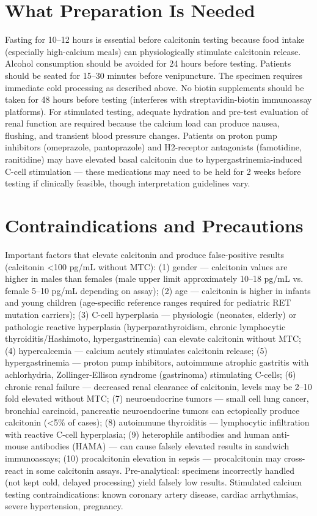 \section*{What Preparation Is Needed}
Fasting for 10--12 hours is essential before calcitonin testing because food intake (especially high-calcium meals) can physiologically stimulate calcitonin release. Alcohol consumption should be avoided for 24 hours before testing. Patients should be seated for 15--30 minutes before venipuncture. The specimen requires immediate cold processing as described above. No biotin supplements should be taken for 48 hours before testing (interferes with streptavidin-biotin immunoassay platforms). For stimulated testing, adequate hydration and pre-test evaluation of renal function are required because the calcium load can produce nausea, flushing, and transient blood pressure changes. Patients on proton pump inhibitors (omeprazole, pantoprazole) and H2-receptor antagonists (famotidine, ranitidine) may have elevated basal calcitonin due to hypergastrinemia-induced C-cell stimulation --- these medications may need to be held for 2 weeks before testing if clinically feasible, though interpretation guidelines vary.

\section*{Contraindications and Precautions}
Important factors that elevate calcitonin and produce false-positive results (calcitonin <100 pg/mL without MTC): (1) gender --- calcitonin values are higher in males than females (male upper limit approximately 10--18 pg/mL vs. female 5--10 pg/mL depending on assay); (2) age --- calcitonin is higher in infants and young children (age-specific reference ranges required for pediatric RET mutation carriers); (3) C-cell hyperplasia --- physiologic (neonates, elderly) or pathologic reactive hyperplasia (hyperparathyroidism, chronic lymphocytic thyroiditis/Hashimoto, hypergastrinemia) can elevate calcitonin without MTC; (4) hypercalcemia --- calcium acutely stimulates calcitonin release; (5) hypergastrinemia --- proton pump inhibitors, autoimmune atrophic gastritis with achlorhydria, Zollinger-Ellison syndrome (gastrinoma) stimulating C-cells; (6) chronic renal failure --- decreased renal clearance of calcitonin, levels may be 2--10 fold elevated without MTC; (7) neuroendocrine tumors --- small cell lung cancer, bronchial carcinoid, pancreatic neuroendocrine tumors can ectopically produce calcitonin (<5\% of cases); (8) autoimmune thyroiditis --- lymphocytic infiltration with reactive C-cell hyperplasia; (9) heterophile antibodies and human anti-mouse antibodies (HAMA) --- can cause falsely elevated results in sandwich immunoassays; (10) procalcitonin elevation in sepsis --- procalcitonin may cross-react in some calcitonin assays. Pre-analytical: specimens incorrectly handled (not kept cold, delayed processing) yield falsely low results. Stimulated calcium testing contraindications: known coronary artery disease, cardiac arrhythmias, severe hypertension, pregnancy.

